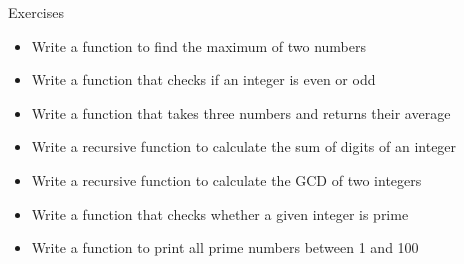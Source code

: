 \documentclass[12pt, aspectratio=169]{beamer}
\begin{document}
    \begin{frame}{Exercises}
        \begin{itemize}
            \item Write a function to find the maximum of two numbers
            \item Write a function that checks if an integer is even or odd
            \item Write a function that takes three numbers and returns their average
            \item Write a recursive function to calculate the sum of digits of an integer
            \item Write a recursive function to calculate the GCD of two integers
            \item Write a function that checks whether a given integer is prime
            \item Write a function to print all prime numbers between 1 and 100
        \end{itemize}
    \end{frame}
\end{document}

